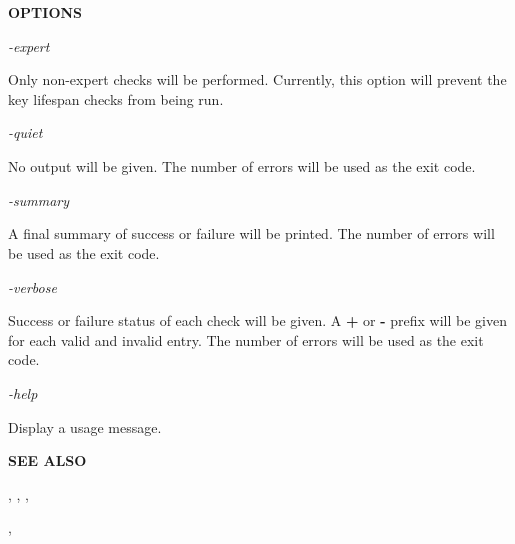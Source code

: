 {\bf OPTIONS}

\begin{description}

\item {\it -expert}\verb" "

Only non-expert checks will be performed.  Currently, this option will prevent
the key lifespan checks from being run.

\item {\it -quiet}\verb" "

No output will be given.
The number of errors will be used as the exit code.

\item {\it -summary}\verb" "

A final summary of success or failure will be printed.
The number of errors will be used as the exit code.

\item {\it -verbose}\verb" "

Success or failure status of each check will be given.
A {\bf +} or {\bf -} prefix will be given for each valid and invalid entry.
The number of errors will be used as the exit code.

\item {\it -help}\verb" "

Display a usage message.

\end{description}

{\bf SEE ALSO}

,
,
,

,

